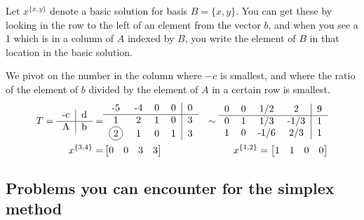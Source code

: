 \documentclass{exam}
\begin{document}
    \begin{answer}
        Let $x^{\{x,y\}}$ denote a basic solution for basis $B=\{x,y\}$.
        You can get these by looking in the row to the left of an element from the vector $b$, and when you see a 1 which is in a column of $A$ indexed by $B$, you write the element of $B$ in that location in the basic solution.

        We pivot on the number in the column where $-c$ is smallest, and where the ratio of the element of $b$ divided by the element of $A$ in a certain row is smallest.
        \begin{equation*}
        \begin{aligned}
            T =
            \begin{tabular}{c|c}
                -c & d \\ \hline
                A & b
            \end{tabular}
             =&
            \begin{tabular}{cccc|c}
                -5 & -4 & 0 & 0 & 0 \\ \hline
                1 & 2 & 1 & 0 & 3 \\
                \circled{2} & 1 & 0 & 1 & 3 \\
            \end{tabular}
            &\sim
            \begin{tabular}{cccc|c}
                0 & 0 & 1/2 & 2 & 9 \\ \hline
                0 & 1 & 1/3 & -1/3 & 1 \\
                1 & 0 & -1/6 & 2/3 & 1 \\
            \end{tabular}
            \\
            x^{\{3,4\}} =& \matrix{0 & 0 & 3 & 3}
             &x^{\{1,2\}} = \matrix{1 & 1 & 0 & 0} \\
        \end{aligned}
        \end{equation*}
    \end{answer}

    \subsection{Problems you can encounter for the simplex method}
\end{document}
